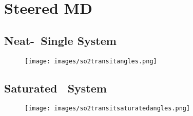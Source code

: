 \section{Steered MD}

\subsection {Neat-\wat~Single \suldiox System}

\begin{figure}[h!]
	\begin{center}
		\texttt{[image: images/so2transitangles.png]}
		\caption{}
		\label{fig:so2-transit-angles}
	\end{center}
\end{figure}

\subsection {Saturated \wat~System}

\begin{figure}[h!]
	\begin{center}
		\texttt{[image: images/so2transitsaturatedangles.png]}
		\caption{}
		\label{fig:so2-transit-saturated-angles}
	\end{center}
\end{figure}
